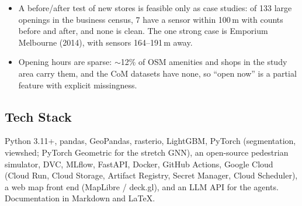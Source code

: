 \documentclass[11pt]{article}
\begin{document}
\begin{itemize}
  \item A before/after test of new stores is feasible only as case studies: of 133 large openings in the business census, 7 have a sensor within 100\,m with counts before and after, and none is clean. The one strong case is Emporium Melbourne (2014), with sensors 164--191\,m away.
  \item Opening hours are sparse: $\sim$12\% of OSM amenities and shops in the study area carry them, and the CoM datasets have none, so ``open now'' is a partial feature with explicit missingness.
\end{itemize}

\subsection{Tech Stack}

Python 3.11+, pandas, GeoPandas, rasterio, LightGBM, PyTorch (segmentation, viewshed; PyTorch Geometric for the stretch GNN), an open-source pedestrian simulator, DVC, MLflow, FastAPI, Docker, GitHub Actions, Google Cloud (Cloud Run, Cloud Storage, Artifact Registry, Secret Manager, Cloud Scheduler), a web map front end (MapLibre / deck.gl), and an LLM API for the agents. Documentation in Markdown and LaTeX.
\end{document}
